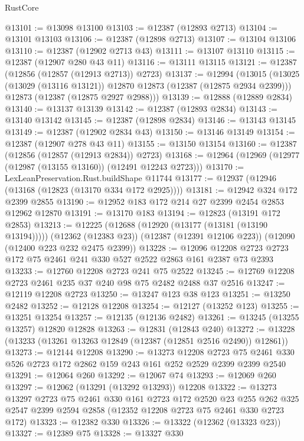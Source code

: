 \begin{lexlean}{RustCore}
\begin{coremodule}
@13101 := @13098 @13100
@13103 := @12387 (@12893 @2713)
@13104 := @13101 @13103
@13106 := @12387 (@12898 @2713)
@13107 := @13104 @13106
@13110 := @12387 (@12902 @2713 @43)
@13111 := @13107 @13110
@13115 := @12387 (@12907 @280 @43 @11)
@13116 := @13111 @13115
@13121 := @12387 (@12856 (@12857 (@12913 @2713)) @2723)
@13137 := @12994
    (@13015
      (@13025 (@13029 (@13116 @13121)) @12870 @12873 (@12387 (@12875 @2934 @2399)))
      @12873
      (@12387 (@12875 @2927 @2988)))
@13139 := @12888 (@12889 @2834)
@13140 := @13137 @13139
@13142 := @12387 (@12893 @2834)
@13143 := @13140 @13142
@13145 := @12387 (@12898 @2834)
@13146 := @13143 @13145
@13149 := @12387 (@12902 @2834 @43)
@13150 := @13146 @13149
@13154 := @12387 (@12907 @278 @43 @11)
@13155 := @13150 @13154
@13160 := @12387 (@12856 (@12857 (@12913 @2834)) @2723)
@13168 := @12964 (@12969 (@12977 (@12987 (@13155 @13160)) (@12491 @12243 @2723)))
@13170 := LexLeanPreservation.Rust.buildShape @11744
@13177 := @12937 (@12946 (@13168 (@12823 (@13170 @334 @172 @2925))))
@13181 := @12942 @324 @172 @2399 @2855
@13190 := @12952 @183 @172 @214 @27 @2399 @2454 @2853 @12962 @12870
@13191 := @13170 @183
@13194 := @12823 (@13191 @172 @2853)
@13213 := @12225
    (@12688 (@12920 (@13177 (@13181 (@13190 @13194)))))
    (@12362 (@12383 @23))
    (@12387 (@12391 @12106 @223))
    (@12090 (@12400 @223 @232 @2475 @2399))
@13228 := @12096 @12208 @2723 @2723 @172 @75 @2461 @241 @330 @527 @2522 @2863 @161 @2387 @73 @2393
@13233 := @12760 @12208 @2723 @241 @75 @2522
@13245 := @12769 @12208 @2723 @2461 @235 @37 @240 @98 @75 @2482 @2488 @37 @2516
@13247 := @12119 @12208 @2723
@13250 := @13247 @123 @38 @123
@13251 := @13250 @2482
@13252 := @12128 @12208
@13254 := @12127 (@13252 @123)
@13255 := @13251 @13254
@13257 := @12135 (@12136 @2482)
@13261 := @13245 (@13255 @13257) @12820 @12828
@13263 := @12831 (@12843 @240)
@13272 := @13228 (@13233 (@13261 @13263 @12849 (@12387 (@12851 @2516 @2490)) @12861))
@13273 := @12144 @12208
@13290 := @13273
    @12208
    @2723
    @75
    @2461
    @330
    @526
    @2723
    @172
    @2862
    @159
    @243
    @161
    @252
    @2529
    @2399
    @2399
    @2540
@13291 := @12064 @260
@13292 := @12067 @74
@13293 := @12069 @260
@13297 := @12062 (@13291 (@13292 @13293)) @12208
@13322 := @13273
    @13297
    @2723
    @75
    @2461
    @330
    @161
    @2723
    @172
    @2520
    @23
    @255
    @262
    @325
    @2547
    @2399
    @2594
    @2858
    (@12352 @12208 @2723 @75 @2461 @330 @2723 @172)
@13323 := @12382 @330
@13326 := @13322 (@12362 (@13323 @23))
@13327 := @12389 @75
@13328 := @13327 @330

\end{coremodule}
\end{lexlean}
